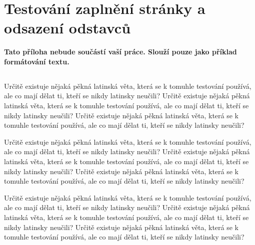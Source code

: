 \documentclass[11pt,twoside,a4paper]{book}
\begin{document}


%
{
\def\CS{$\cal C\kern-0.1667em\lower.5ex\hbox{$\cal S$}\kern-0.075em $}

}


%

\appendix

\chapter{Testování zaplnění stránky a odsazení odstavců}
\textbf{\large Tato příloha nebude součástí vaší práce. 
Slouží pouze jako příklad formátování textu.}

\section*{}
Určitě existuje nějaká pěkná latinská věta, která se k tomuhle testování používá, ale co mají dělat ti, kteří se nikdy latinsky neučili? Určitě existuje nějaká pěkná latinská věta, která se k tomuhle testování používá, ale co mají dělat ti, kteří se nikdy latinsky neučili? Určitě existuje nějaká pěkná latinská věta, která se k tomuhle testování používá, ale co mají dělat ti, kteří se nikdy latinsky neučili?

Určitě existuje nějaká pěkná latinská věta, která se k tomuhle testování používá, ale co mají dělat ti, kteří se nikdy latinsky neučili? Určitě existuje nějaká pěkná latinská věta, která se k tomuhle testování používá, ale co mají dělat ti, kteří se nikdy latinsky neučili? Určitě existuje nějaká pěkná latinská věta, která se k tomuhle testování používá, ale co mají dělat ti, kteří se nikdy latinsky neučili?

Určitě existuje nějaká pěkná latinská věta, která se k tomuhle testování používá, ale co mají dělat ti, kteří se nikdy latinsky neučili? Určitě existuje nějaká pěkná latinská věta, která se k tomuhle testování používá, ale co mají dělat ti, kteří se nikdy latinsky neučili? Určitě existuje nějaká pěkná latinská věta, která se k tomuhle testování používá, ale co mají dělat ti, kteří se nikdy latinsky neučili?
\end{document}
